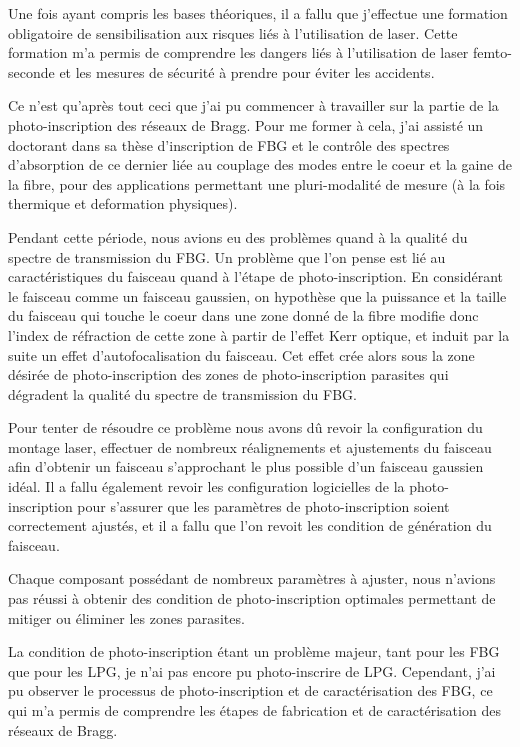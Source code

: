 \documentclass[11pt, openright]{book}
\begin{document}
    Une fois ayant compris les bases théoriques, il a fallu que j'effectue une formation obligatoire de sensibilisation aux risques liés à l'utilisation de laser. Cette formation m'a permis de comprendre les dangers liés à l'utilisation de laser femto-seconde et les mesures de sécurité à prendre pour éviter les accidents.
    
    Ce n'est qu'après tout ceci que j'ai pu commencer à travailler sur la partie de la photo-inscription des réseaux de Bragg. Pour me former à cela, j'ai assisté un doctorant dans sa thèse d'inscription de FBG  et le contrôle des spectres d'absorption de ce dernier liée au couplage des modes entre le coeur et la gaine de la fibre, pour des applications permettant une pluri-modalité de mesure (à la fois thermique et deformation physiques). 

    Pendant cette période, nous avions eu des problèmes quand à la qualité du spectre de transmission du FBG. Un problème que l'on pense est lié au caractéristiques du faisceau quand à l'étape de photo-inscription. En considérant le faisceau comme un faisceau gaussien, on hypothèse que la puissance et la taille du faisceau qui touche le coeur dans une zone donné de la fibre modifie donc l'index de réfraction de cette zone à partir de l'effet Kerr optique, et induit par la suite un effet d'autofocalisation du faisceau. 
    Cet effet crée alors sous la zone désirée de photo-inscription des zones de photo-inscription parasites qui dégradent la qualité du spectre de transmission du FBG. 

    Pour tenter de résoudre ce problème nous avons dû revoir la configuration du montage laser, effectuer de nombreux réalignements et ajustements du faisceau afin d'obtenir un faisceau s'approchant le plus possible d'un faisceau gaussien idéal. Il a fallu également revoir les configuration logicielles de la photo-inscription pour s'assurer que les paramètres de photo-inscription soient correctement ajustés, et il a fallu que l'on revoit les condition de génération du faisceau. 

    Chaque composant possédant de nombreux paramètres à ajuster, nous n'avions pas réussi à obtenir des condition de photo-inscription optimales permettant de mitiger ou éliminer les zones parasites.

    La condition de photo-inscription étant un problème majeur, tant pour les FBG que pour les LPG, je n'ai pas encore pu photo-inscrire de LPG. Cependant, j'ai pu observer le processus de photo-inscription et de caractérisation des FBG, ce qui m'a permis de comprendre les étapes de fabrication et de caractérisation des réseaux de Bragg.
\end{document}
